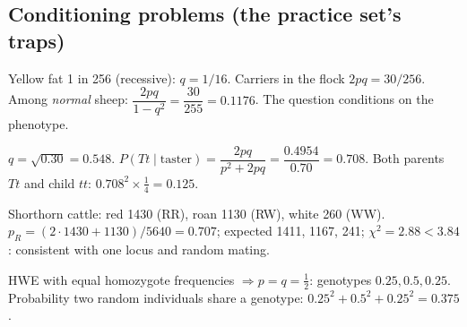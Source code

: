 \subsection{Conditioning problems (the practice set's traps)}
\begin{worked}
Yellow fat 1 in 256 (recessive): $q=1/16$. Carriers in the flock $2pq=30/256$. Among \emph{normal} sheep:
$\dfrac{2pq}{1-q^2}=\dfrac{30}{255}=0.1176$. The question conditions on the phenotype.
\end{worked}
\begin{worked}
$q=\sqrt{0.30}=0.548$. $P(Tt\mid\text{taster})=\dfrac{2pq}{p^2+2pq}=\dfrac{0.4954}{0.70}=0.708$. Both parents $Tt$ and child
$tt$: $0.708^2\times\tfrac14=0.125$.
\end{worked}
\begin{worked}[: codominance]
Shorthorn cattle: red 1430 (RR), roan 1130 (RW), white 260 (WW). $p_R=(2\cdot1430+1130)/5640=0.707$; expected 1411,
1167, 241; $\chi^2=2.88<3.84$: consistent with one locus and random mating.
\end{worked}
\begin{worked}
HWE with equal homozygote frequencies $\Rightarrow p=q=\tfrac12$: genotypes $0.25,0.5,0.25$. Probability two random
individuals share a genotype: $0.25^2+0.5^2+0.25^2=0.375$.
\end{worked}


